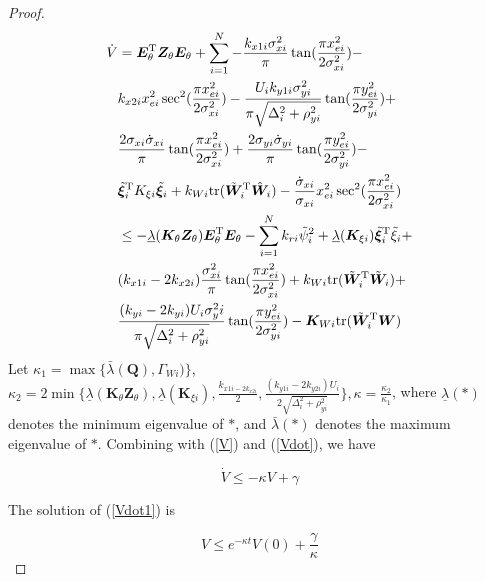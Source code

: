 \documentclass[conference,letterpaper,10.5pt]{IEEEtran}
\begin{document}
\begin{proof}
	\begin{equation}\label{Vdot}
		\begin{aligned}
			\dot{V}&=\bm{E}^{\rm T}_\theta \bm{Z}_\theta \bm{E}_\theta+\sum^N_{i=1}-\frac{k_{x1i}\sigma^2_{xi}}{\pi}\tan(\frac{\pi x^2_{ei}}{2\sigma^2_{xi}})-\\
			&k_{x2i}x^2_{ei}\sec^2(\frac{\pi x^2_{ei}}{2\sigma^2_{xi}})-\frac{U_ik_{y1i}\sigma^2_{yi}}{\pi\sqrt{\Delta^2_i+\rho^2_{yi}}}\tan(\frac{\pi y^2_{ei}}{2\sigma^2_{yi}})+\\
			&\frac{2\sigma_{xi}\dot{\sigma}_{xi}}{\pi}\tan(\frac{\pi x_{ei}^2}{2\sigma^2_{xi}})+\frac{2\sigma_{yi}\dot{\sigma}_{yi}}{\pi}\tan(\frac{\pi y_{ei}^2}{2\sigma^2_{yi}})-\\
			&\tilde{\bm{\xi}}^{\rm T}_iK_{\xi i}\tilde{\bm{\xi}}_i+k_{Wi}{\rm tr}(\tilde{\bm{W}}^{\rm T}_i\hat{\bm{W}}_i)-\frac{\dot{\sigma}_{xi}}{\sigma_{xi}}x^2_{ei}\sec^2(\frac{\pi x_{ei}^2}{2\sigma^2_{xi}})\\
			&\leq -\underline{\lambda}(\bm{K}_\theta \bm{Z}_\theta)\bm{E}^{\rm T}_\theta \bm{E}_\theta-\sum^N_{i=1}k_{ri}\tilde{\psi}^2_i+\underline{\lambda}(\bm{K}_{\xi i})\tilde{\bm{\xi}}^{\rm T}_i\tilde{\xi}_i+\\
			&(k_{x1i}-2k_{x2i})\frac{\sigma^2_{xi}}{\pi}\tan(\frac{\pi x^2_{ei}}{2\sigma^2_{xi}})+k_{Wi}{\rm tr}(\tilde{\bm{W}}^{\rm T}_i\tilde{\bm{W}}_i)+\\
			&\frac{(k_{yi}-2k_{yi})U_i\sigma^2_yi}{\pi \sqrt{\Delta^2_i+\rho^2_{yi}}}\tan(\frac{\pi y^2_{ei}}{2\sigma^2_{yi}})-\bm{K}_{Wi}{\rm tr}(\tilde{\bm{W}}^{\rm T}_i\bm{W})
		\end{aligned}
	\end{equation}
	Let $\kappa_1 = \max\{\bar{\lambda}(\bm{Q}),\Gamma_{Wi})\}$, $\kappa_2=2\min\{\underline{\lambda}(\bm{K}_\theta \bm{Z}_\theta),\underline{\lambda}(\bm{K}_{\xi i}),\frac{k_{x1i-2k_{x2i}}}{2},\frac{(k_{y1i}-2k_{y2i})U_i}{2\sqrt{\Delta^2_{i}+\rho^2_{yi}}}\}, \kappa=\frac{\kappa_2}{\kappa_1}$, where $\underline{\lambda}(*)$ denotes the minimum eigenvalue of $*$, and $\bar{\lambda}(*)$ denotes the maximum eigenvalue of $*$. Combining with (\ref{V}) and (\ref{Vdot}), we have
	
	\begin{equation}\label{Vdot1}
		\dot{V}\leq -\kappa V+\gamma
	\end{equation}  
	
	The solution of (\ref{Vdot1}) is 
	
	\begin{equation} \label{Vbound}
		V\leq e^{-\kappa t}V(0)+\frac{\gamma}{\kappa}
	\end{equation}
	

\end{proof}
\end{document}
